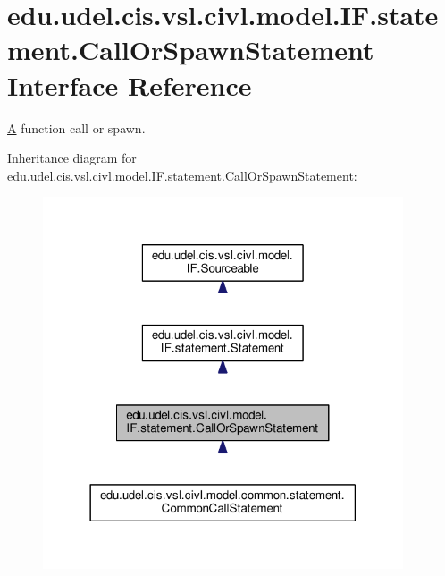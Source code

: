 \hypertarget{interfaceedu_1_1udel_1_1cis_1_1vsl_1_1civl_1_1model_1_1IF_1_1statement_1_1CallOrSpawnStatement}{}\section{edu.\+udel.\+cis.\+vsl.\+civl.\+model.\+I\+F.\+statement.\+Call\+Or\+Spawn\+Statement Interface Reference}
\label{interfaceedu_1_1udel_1_1cis_1_1vsl_1_1civl_1_1model_1_1IF_1_1statement_1_1CallOrSpawnStatement}


\hyperlink{structA}{A} function call or spawn.  




Inheritance diagram for edu.\+udel.\+cis.\+vsl.\+civl.\+model.\+I\+F.\+statement.\+Call\+Or\+Spawn\+Statement\+:
\nopagebreak
\begin{figure}[H]
\begin{center}
\leavevmode
\includegraphics[width=302pt]{interfaceedu_1_1udel_1_1cis_1_1vsl_1_1civl_1_1model_1_1IF_1_1statement_1_1CallOrSpawnStatement__inherit__graph}
\end{center}
\end{figure}


